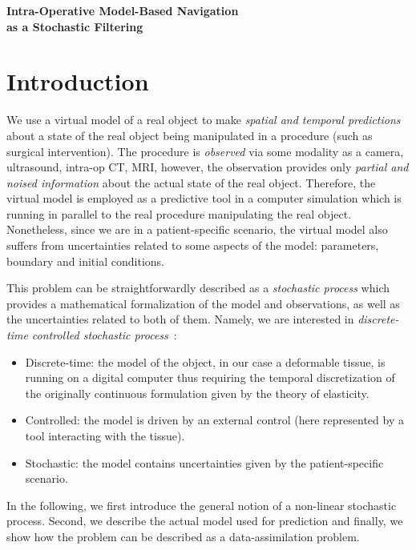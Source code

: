 \documentclass[paper=a4, fontsize=11pt]{article}
\begin{document}
	
\begin{center}
\bf{\LARGE Intra-Operative Model-Based Navigation\\ as a Stochastic Filtering}
\end{center}

\section{Introduction}
We use a virtual model of a real object to make \emph{spatial and temporal predictions} about a state 
of the real object being manipulated in a procedure (such as surgical intervention). 
The procedure is \emph{observed} via some modality as a camera, ultrasound, intra-op CT, MRI, 
however, the observation provides only 
\emph{partial and noised information} about the actual state of the real object.
Therefore, the virtual model is employed as a predictive tool in a computer simulation which is running in parallel to the real procedure manipulating the real object.
Nonetheless, since we are in a patient-specific scenario, the virtual model also suffers from uncertainties 
related to some aspects of the model: parameters, boundary and initial conditions. 

This problem can be straightforwardly described as a \emph{stochastic process} which provides a mathematical 
formalization of the model and observations, as well as the uncertainties related to both of them. 
Namely, we are interested in \emph{discrete-time controlled stochastic process}~\cite{grewalkalman}:
\begin{itemize}
	\item Discrete-time: the model of the object, in our case a deformable tissue, is running on a digital computer thus requiring the temporal discretization of the originally continuous formulation given by the theory of elasticity.
	\item Controlled: the model is driven by an external control (here represented by a tool interacting with the tissue).
	\item Stochastic: the model contains uncertainties given by the patient-specific scenario. 
\end{itemize}
In the following, we first introduce the general notion of a non-linear stochastic process. Second, we describe the actual model used for prediction and finally, we show how the problem can be described as a data-assimilation problem. 
\end{document}
